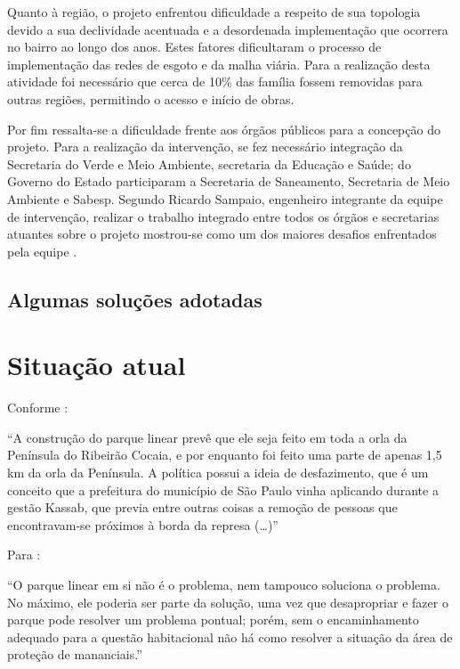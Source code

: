 	Quanto à região, o projeto enfrentou dificuldade a respeito de sua topologia devido a sua declividade acentuada e a desordenada implementação que ocorrera no bairro ao longo dos anos. Estes fatores dificultaram o processo de implementação das redes de esgoto e da malha viária. Para a realização desta atividade foi necessário que cerca de 10\% das família fossem removidas para outras regiões, permitindo o acesso e início de obras. 
	
	Por fim ressalta-se a dificuldade frente aos órgãos públicos para a concepção do projeto. Para a realização da intervenção, se fez necessário integração da Secretaria do Verde e Meio Ambiente, secretaria da Educação e Saúde; do Governo do Estado participaram a Secretaria de Saneamento, Secretaria de Meio Ambiente e Sabesp. Segundo Ricardo Sampaio, engenheiro integrante da equipe de intervenção, realizar o trabalho integrado entre todos os órgãos e secretarias atuantes sobre o projeto mostrou-se como um dos maiores desafios enfrentados pela equipe \cite{Barda2012}.
	
	\section{Algumas soluções adotadas}
	
	\chapter{Situação atual}
	
	Conforme :
	
	\begin{citacao}
	    ``A construção do parque linear prevê que ele seja feito em toda a orla da Península do Ribeirão Cocaia, e por enquanto foi feito uma parte de apenas 1,5 km da orla da Península. A política possui a ideia de desfazimento, que é um conceito que a prefeitura do município de São Paulo vinha aplicando durante a gestão Kassab, que previa entre outras coisas a remoção de pessoas que encontravam-se próximos à borda da represa (\dots)''
    \end{citacao}
	
	Para :
	
	\begin{citacao}
	   ``O parque linear em si não é o problema, nem tampouco soluciona o problema. No máximo, ele poderia ser parte da solução, uma vez que desapropriar e fazer o parque pode resolver um problema pontual; porém, sem o encaminhamento adequado para a questão habitacional não há como resolver a situação da área de proteção de mananciais.''
	\end{citacao}
	

